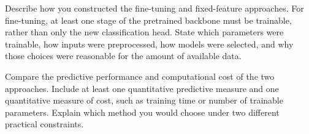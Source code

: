\documentclass[a4paper]{article}
\begin{document}
\begin{tcolorbox}[title=2.1 Describe and justify the two methods (2 marks)]
Describe how you constructed the fine-tuning and fixed-feature approaches. For fine-tuning, at least one stage of the pretrained backbone must be trainable, rather than only the new classification head. State which parameters were trainable, how inputs were preprocessed, how models were selected, and why those choices were reasonable for the amount of available data.
\end{tcolorbox}

\begin{tcolorbox}[title=2.2 Compare effectiveness and cost (2 marks)]
Compare the predictive performance and computational cost of the two approaches. Include at least one quantitative predictive measure and one quantitative measure of cost, such as training time or number of trainable parameters. Explain which method you would choose under two different practical constraints.
\end{tcolorbox}
\end{document}
